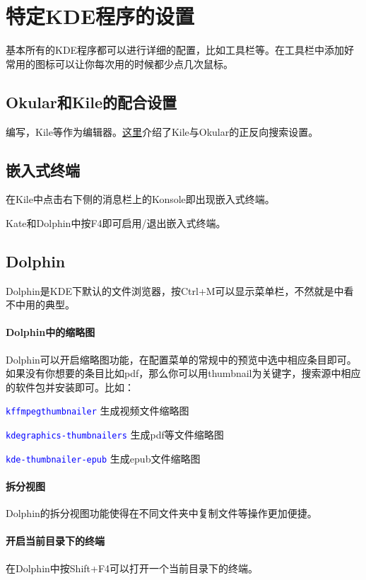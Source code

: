 \documentclass[12pt,openany]{book}
\newcommand{\soft}[1]{\texttt{\textcolor{blue}{#1}}}
\begin{document}
\section{特定KDE程序的设置}
基本所有的KDE程序都可以进行详细的配置，比如工具栏等。在工具栏中添加好常用的图标可以让你每次用的时候都少点几次鼠标。
\subsection{Okular和Kile的配合设置}
编写，Kile等作为编辑器。\href{http://zpj.blog.ustc.edu.cn/?p=338}{这里}介绍了Kile与Okular的正反向搜索设置。

\subsection{嵌入式终端}
在Kile中点击右下侧的消息栏上的Konsole即出现嵌入式终端。

Kate和Dolphin中按F4即可启用/退出嵌入式终端。

\subsection{Dolphin}
Dolphin是KDE下默认的文件浏览器，按Ctrl+M可以显示菜单栏，不然就是中看不中用的典型。
\paragraph{Dolphin中的缩略图} Dolphin可以开启缩略图功能，在配置菜单的常规中的预览中选中相应条目即可。如果没有你想要的条目比如pdf，那么你可以用thumbnail为关键字，搜索源中相应的软件包并安装即可。比如：
\begin{compactenum}
 \item \soft{kffmpegthumbnailer} 生成视频文件缩略图
 \item \soft{kdegraphics-thumbnailers} 生成pdf等文件缩略图
 \item \soft{kde-thumbnailer-epub} 生成epub文件缩略图
\end{compactenum}
\paragraph{拆分视图} Dolphin的拆分视图功能使得在不同文件夹中复制文件等操作更加便捷。

\paragraph{开启当前目录下的终端} 在Dolphin中按Shift+F4可以打开一个当前目录下的终端。
\end{document}
